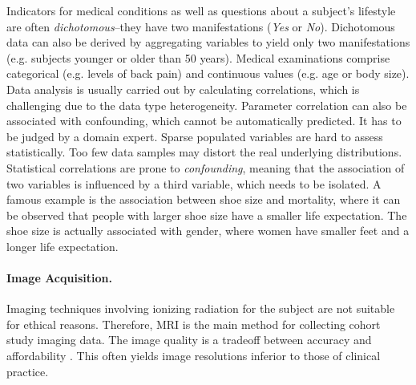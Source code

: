 \documentclass[journal]{style/vgtc} 			          %
\newcommand{\rem}[1]{\textcolor{red}{\sout{#1}}}
\begin{document}
Indicators for medical conditions as well as questions about a subject's lifestyle are often \emph{dichotomous}--they have two manifestations (\emph{Yes} or \emph{No}).
%
Dichotomous data can also be derived by aggregating variables to yield only two manifestations (e.g. subjects younger or older than 50 years).
%
Medical examinations comprise categorical (e.g. levels of back pain) and continuous values (e.g. age or body size).
%
Data analysis is usually carried out by calculating correlations,
which is challenging due to the data type heterogeneity.
%
Parameter correlation can also be associated with confounding, which cannot be automatically predicted. 
%
It has to be judged by a domain expert.
%
Sparse populated variables are hard to assess statistically.
%
Too few data samples may distort the real underlying distributions.
%
Statistical correlations are prone to \emph{confounding}, meaning that the association of two variables is influenced by a third variable, which needs to be isolated.
%
A famous example is the association between shoe size and mortality, where it can be observed that people with larger shoe size have a smaller life expectation. %
%
The shoe size is actually associated with gender, where women have smaller feet and a longer life expectation.

\paragraph{Image Acquisition.} Imaging techniques involving ionizing radiation for the subject are not suitable for ethical reasons.
%
Therefore, MRI is the main method for collecting cohort study imaging data.
%
The image quality is a tradeoff between accuracy and affordability \cite{Preim2014}.
%
This often yields image resolutions inferior to those of clinical practice.%
%
\end{document}
